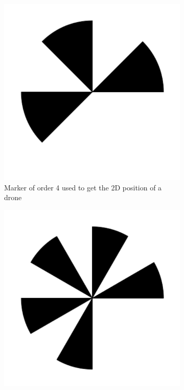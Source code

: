 \begin{figure}[H]
    \centering
    \begin{subfigure}[b]{0.2\textwidth}
        \includegraphics[width=\textwidth]{graphics/marker_order_4.pdf}
        \caption{Marker of order 4 used to get the 2D position of a drone}
        \label{fig:markerlocator_order_4}
    \end{subfigure}
    \quad %
    \begin{subfigure}[b]{0.2\textwidth}
        \includegraphics[width=\textwidth]{graphics/marker_order_6.pdf}

\end{subfigure}
\end{figure}

